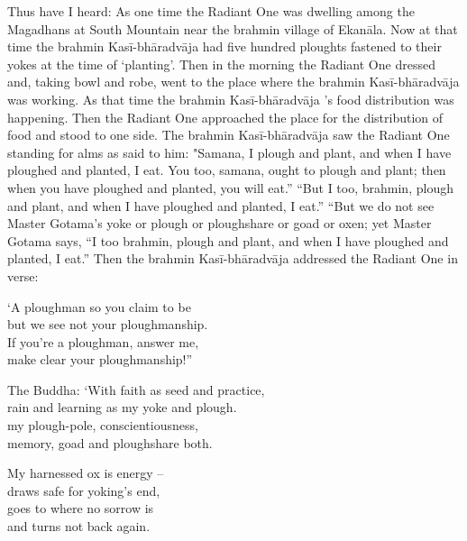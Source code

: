 Thus have I heard:
As one time the Radiant One was dwelling among the Magadhans at South Mountain near the brahmin village of Ekan\=ala. Now at that time the brahmin Kasī-bh\=aradv\=aja had five hundred ploughts fastened to their yokes at the time of `planting'. Then in the morning the Radiant One dressed and, taking bowl and robe, went to the place where the brahmin Kasī-bh\=aradv\=aja was working.
As that time the brahmin Kasī-bh\=aradv\=aja 's food distribution was happening. Then the Radiant One approached the place for the distribution of food and stood to one side. The brahmin Kasī-bh\=aradv\=aja saw the Radiant One standing for alms as said to him:
"Samana, I plough and plant, and when I have ploughed and planted, I eat. You too, samana, ought to plough and plant; then when you have ploughed and planted, you will eat.”
“But I too, brahmin, plough and plant, and when I have ploughed and planted, I eat.”
“But we do not see Master Gotama's yoke or plough or ploughshare or goad or oxen; yet Master Gotama says, “I too brahmin, plough and plant, and when I have ploughed and planted, I eat.”
Then the brahmin Kasī-bh\=aradv\=aja addressed the Radiant One in verse:
   
\begin{MyDescription}{}
`A ploughman so you claim to be\\
   but we see not your ploughmanship.\\
   If you're a ploughman, answer me,\\
   make clear your ploughmanship!”
\end{MyDescription}

\begin{MyDescription}{The Buddha:}
`With faith as seed and practice,\\
rain and learning as my yoke and plough.\\
my plough-pole, conscientiousness,\\
memory, goad and ploughshare both.
\end{MyDescription}
   
\begin{MyDescription}{}
My harnessed ox is energy –\\
draws safe for yoking's end,\\
goes to where no sorrow is\\
and turns not back again.\\
\end{MyDescription}   

